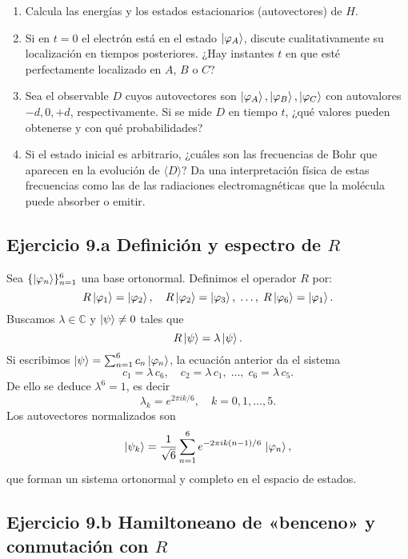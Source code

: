 \documentclass[a4paper,11pt]{article}
\begin{document}
\begin{enumerate}
  \item Calcula las energías y los estados estacionarios (autovectores) de \(H\).
  \item Si en \(t=0\) el electrón está en el estado \(\ket{\varphi_A}\), discute cualitativamente su localización en tiempos posteriores. ¿Hay instantes \(t\) en que esté perfectamente localizado en \(A\), \(B\) o \(C\)?
  \item Sea el observable \(D\) cuyos autovectores son \(\ket{\varphi_A},\ket{\varphi_B},\ket{\varphi_C}\) con autovalores \(-d,0,+d\), respectivamente. Si se mide \(D\) en tiempo \(t\), ¿qué valores pueden obtenerse y con qué probabilidades?
  \item Si el estado inicial es arbitrario, ¿cuáles son las frecuencias de Bohr que aparecen en la evolución de \(\langle D\rangle\)? Da una interpretación física de estas frecuencias como las de las radiaciones electromagnéticas que la molécula puede absorber o emitir.
\end{enumerate}

\subsection*{Ejercicio 9.a Definición y espectro de \(R\)}

Sea \(\{\ket{\varphi_n}\}_{n=1}^6\) una base ortonormal. Definimos el operador \(R\) por:
\[
R\ket{\varphi_1}=\ket{\varphi_2},\quad
R\ket{\varphi_2}=\ket{\varphi_3},\;\dots,\;
R\ket{\varphi_6}=\ket{\varphi_1}.
\]
Buscamos \(\lambda\in\mathbb{C}\) y \(\ket{\psi}\neq0\) tales que
\[
R\ket{\psi}=\lambda\ket{\psi}.
\]
Si escribimos \(\ket{\psi}=\sum_{n=1}^6c_n\ket{\varphi_n}\), la ecuación anterior da el sistema
\[
c_1=\lambda\,c_6,\quad
c_2=\lambda\,c_1,\;\dots,\;
c_6=\lambda\,c_5.
\]
De ello se deduce \(\lambda^6=1\), es decir
\[
\lambda_k = e^{2\pi i k/6},\quad k=0,1,\dots,5.
\]
Los autovectores normalizados son
\[
\ket{\psi_k}
= \frac{1}{\sqrt6}\sum_{n=1}^6 e^{-2\pi i k(n-1)/6}\,\ket{\varphi_n},
\]
que forman un sistema ortonormal y completo en el espacio de estados.

\subsection*{Ejercicio 9.b Hamiltoneano de «benceno» y conmutación con \(R\)}
\end{document}
